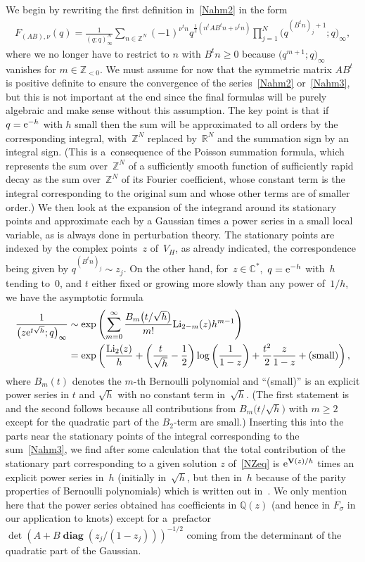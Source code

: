 \documentclass[pdftex]{sigma}
\numberwithin{equation}{section}
\def\R{\mathbb R}
\def\C{\mathbb C}
\def\Z{\mathbb Z}
\def\Q{\mathbb Q}
\def\s{\sigma}
\def\V{\mathbf V}
\def\Li{\mathrm{Li}}
\def\diag{\operatorname{\mathbf{diag}}} %
\begin{document}
We begin by rewriting the first definition in~\eqref{Nahm2} in the form
\begin{gather}
\label{Nahm3}
F_{(A B),\nu}(q) =
\frac1{(q;q)_\infty^N} \sum_{n\in\Z^N} (-1)^{\nu^tn} q^{\frac12(n^tAB^tn+\nu^tn)}
\prod_{j=1}^N \bigl(q^{(B^tn)_j+1};q\bigr)_\infty ,
\end{gather}
where we no longer have to restrict to $n$ with $B^tn\ge0$ because
$\big(q^{m+1};q\big)_\infty$ vanishes for $m\in\Z_{<0}$. We must assume for now that
the symmetric matrix $AB^t$ is positive definite to ensure the convergence of the
series~\eqref{Nahm2} or~\eqref{Nahm3}, but this is not important at the end since
the final formulas will be purely algebraic and make sense without this assumption.
The key point is that if $q={\rm e}^{-h}$ with $h$ small then the sum will be approximated
to all orders by the corresponding integral, with~$\Z^N$ replaced by~$\R^N$ and the
summation sign by an integral sign. (This is a~consequence of the Poisson summation
formula, which represents the sum over~$\Z^N$ of a sufficiently smooth function of
sufficiently rapid decay as the sum over~$\Z^N$ of its Fourier coefficient, whose
constant term is the integral corresponding to the original sum and whose other
terms are of smaller order.) We then look at the expansion of the integrand around its
stationary points and approximate each by a Gaussian times a power series in a small
local variable, as is always done in perturbation theory. The stationary
points are indexed by the complex points~$z$ of~$V_H$, as already indicated,
the correspondence being given by $q^{(B^tn)_j} \sim z_j$.
On the other hand, for~${z\in\C^*}$,~$q={\rm e}^{-h}$ with~$h$ tending to~0, and
$t$ either fixed or growing more slowly than any power of~$1/h$, we have the asymptotic
formula
\begin{align}
\frac1{\big(z{\rm e}^{t\sqrt h};q\big)_\infty} & \sim
\exp\left(\sum_{m=0}^\infty \frac{B_m\bigl(t/\sqrt h\bigr)}{m!}
\Li_{2-m}(z) h^{m-1}\right)\nonumber \\
& = \exp\left(\frac{\Li_2(z)}h + \left(\frac t{\sqrt h}-\frac12\right)
\log\left(\frac1{1-z}\right)
+ \frac{t^2}2 \frac z{1-z} + \text{(small)}\right) ,\label{newpsixz}
\end{align}
where $B_m(t)$ denotes the $m$-th Bernoulli polynomial and ``(small)'' is an explicit
power series in $t$ and $\sqrt h$ with no constant term in~$\sqrt h$. (The first
statement is \cite[Lemma, p.~53]{Zagier} and the second follows because all
contributions from $B_m\big(t/\sqrt h\big)$ with $m\ge2$ except for the quadratic part of
the $B_2$-term are small.) Inserting this into the parts near the stationary points
of the integral corresponding to the sum~\eqref{Nahm3}, we find after some calculation
that the total contribution of the stationary part corresponding to a given solution
$z$ of~\eqref{NZeq} is ${\rm e}^{\V(z)/h}$ times an explicit power series in~$h$ (initially
in~$\sqrt h$, but then in~$h$ because of the parity properties of Bernoulli
polynomials) which is written out in~\cite{DG}. We only mention here that the power
series obtained has coefficients in $\Q(z)$ (and hence in $F_\s$ in our application
to knots) except for a~prefactor~${\det(A+B \diag(z_j/(1-z_j)))^{-1/2}}$
coming from the determinant of the quadratic part of the Gaussian.
\end{document}
